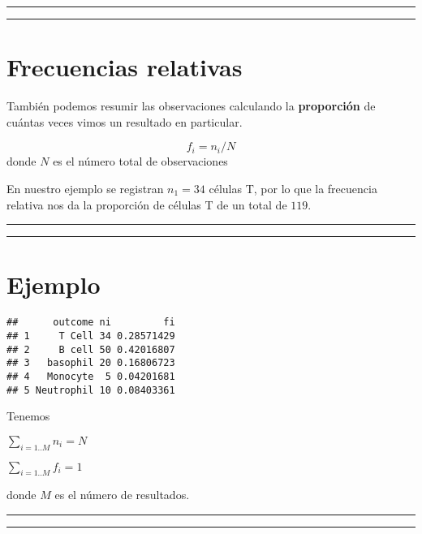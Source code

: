 \documentclass[
]{book}
\begin{document}
\begin{center}\rule{0.5\linewidth}{0.5pt}\end{center}

\begin{center}\rule{0.5\linewidth}{0.5pt}\end{center}

\hypertarget{frecuencias-relativas}{%
\section{Frecuencias relativas}\label{frecuencias-relativas}}

También podemos resumir las observaciones calculando la \textbf{proporción} de cuántas veces vimos un resultado en particular.

\[f_i=n_i/N\] donde \(N\) es el número total de observaciones

En nuestro ejemplo se registran \(n_1=34\) células T, por lo que la frecuencia relativa nos da la proporción de células T de un total de \(119\).

\begin{center}\rule{0.5\linewidth}{0.5pt}\end{center}

\begin{center}\rule{0.5\linewidth}{0.5pt}\end{center}

\hypertarget{ejemplo-1}{%
\section{Ejemplo}\label{ejemplo-1}}

\begin{verbatim}
##      outcome ni         fi
## 1     T Cell 34 0.28571429
## 2     B cell 50 0.42016807
## 3   basophil 20 0.16806723
## 4   Monocyte  5 0.04201681
## 5 Neutrophil 10 0.08403361
\end{verbatim}

Tenemos

\(\sum_{i=1..M} n_i = N\)

\(\sum_{i=1..M} f_i = 1\)

donde \(M\) es el número de resultados.

\begin{center}\rule{0.5\linewidth}{0.5pt}\end{center}

\begin{center}\rule{0.5\linewidth}{0.5pt}\end{center}
\end{document}
